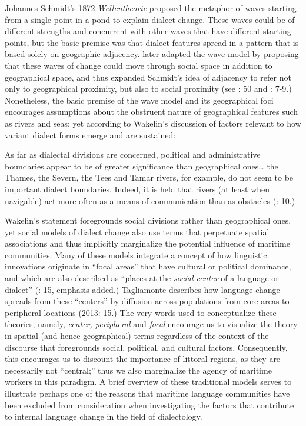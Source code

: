 Johannes Schmidt’s 1872 \textit{Wellentheorie} proposed the metaphor of waves starting from a single point in a pond to explain dialect change. These waves could be of different strengths and concurrent with other waves that have different starting points, but the basic premise was that dialect features spread in a pattern that is based solely on geographic adjacency. \citet{BaileyEtAl1993} later adapted the wave model by proposing that these waves of change could move through social space in addition to geographical space, and thus expanded Schmidt’s idea of adjacency to refer not only to geographical proximity, but also to social proximity (see \citealt{Petyt1980}: 50 and \citealt{AuerEtAl2005}: 7-9.) Nonetheless, the basic premise of the wave model and its geographical foci encourages assumptions about the obstruent nature of geographical features such as rivers and seas; yet according to Wakelin’s discussion of factors relevant to how variant dialect forms emerge and are sustained: 

As far as dialectal divisions are concerned, political and administrative boundaries appear to be of greater significance than geographical ones… the Thames, the Severn, the Tees and Tamar rivers, for example, do not seem to be important dialect boundaries. Indeed, it is held that rivers (at least when navigable) act more often as a means of communication than as obstacles (\citealt{Wakelin1977}: 10.)

Wakelin’s statement foregrounds social divisions rather than geographical ones, yet social models of dialect change also use terms that perpetuate spatial associations and thus implicitly marginalize the potential influence of maritime communities. Many of these models integrate a concept of how linguistic innovations originate in “focal areas” that have cultural or political dominance, and which are also described as “places at the \textit{social center} of a language or dialect” (\citealt{Tagliamonte2013}: 15, emphasis added.) Tagliamonte describes how language change spreads from these “centers” by diffusion across populations from core areas to peripheral locations (2013: 15.) The very words used to conceptualize these theories, namely, \textit{center, peripheral} and \textit{focal} encourage us to visualize the theory in spatial (and hence geographical) terms regardless of the context of the discourse that foregrounds social, political, and cultural factors. Consequently, this encourages us to discount the importance of littoral regions, as they are necessarily not “central;” thus we also marginalize the agency of maritime workers in this paradigm. A brief overview of these traditional models serves to illustrate perhaps one of the reasons that maritime language communities have been excluded from consideration when investigating the factors that contribute to internal language change in the field of dialectology. 

